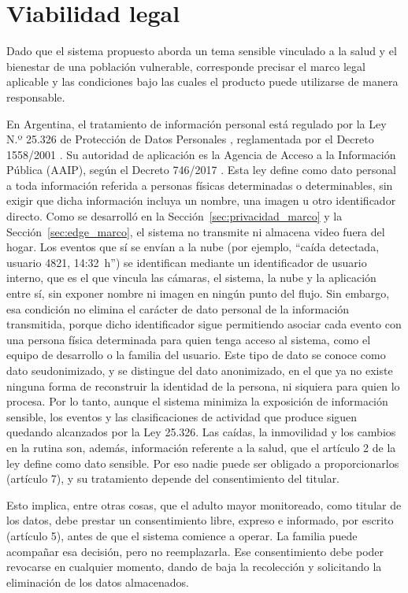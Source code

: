 \section{Viabilidad legal}
\label{sec:viabilidad-legal}

Dado que el sistema propuesto aborda un tema sensible vinculado a la salud y el bienestar de una población vulnerable, corresponde precisar el marco legal aplicable y las condiciones bajo las cuales el producto puede utilizarse de manera responsable.

En Argentina, el tratamiento de información personal está regulado por la Ley N.º 25.326 de Protección de Datos Personales \parencite{Argentina2000}, reglamentada por el Decreto 1558/2001 \parencite{Argentina2001}.
Su autoridad de aplicación es la Agencia de Acceso a la Información Pública (AAIP), según el Decreto 746/2017 \parencite{Argentina2017}.
Esta ley define como dato personal a toda información referida a personas físicas determinadas o determinables, sin exigir que dicha información incluya un nombre, una imagen u otro identificador directo.
Como se desarrolló en la Sección~\ref{sec:privacidad_marco} y la Sección~\ref{sec:edge_marco}, el sistema no transmite ni almacena video fuera del hogar.
Los eventos que sí se envían a la nube (por ejemplo, ``caída detectada, usuario 4821, 14:32~h'') se identifican mediante un identificador de usuario interno, que es el que vincula las cámaras, el sistema, la nube y la aplicación entre sí, sin exponer nombre ni imagen en ningún punto del flujo.
Sin embargo, esa condición no elimina el carácter de dato personal de la información transmitida, porque dicho identificador sigue permitiendo asociar cada evento con una persona física determinada para quien tenga acceso al sistema, como el equipo de desarrollo o la familia del usuario.
Este tipo de dato se conoce como dato seudonimizado, y se distingue del dato anonimizado, en el que ya no existe ninguna forma de reconstruir la identidad de la persona, ni siquiera para quien lo procesa.
Por lo tanto, aunque el sistema minimiza la exposición de información sensible, los eventos y las clasificaciones de actividad que produce siguen quedando alcanzados por la Ley 25.326.
Las caídas, la inmovilidad y los cambios en la rutina son, además, información referente a la salud, que el artículo 2 de la ley define como dato sensible.
Por eso nadie puede ser obligado a proporcionarlos (artículo 7), y su tratamiento depende del consentimiento del titular.

Esto implica, entre otras cosas, que el adulto mayor monitoreado, como titular de los datos, debe prestar un consentimiento libre, expreso e informado, por escrito (artículo 5), antes de que el sistema comience a operar.
La familia puede acompañar esa decisión, pero no reemplazarla.
Ese consentimiento debe poder revocarse en cualquier momento, dando de baja la recolección y solicitando la eliminación de los datos almacenados.

